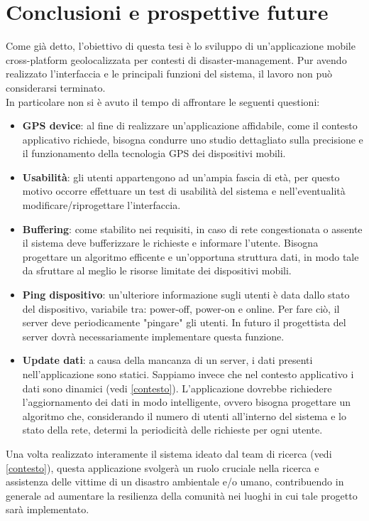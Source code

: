 \chapter{Conclusioni e prospettive future}

Come già detto, l'obiettivo di questa tesi è lo sviluppo di un'applicazione mobile cross-platform geolocalizzata per contesti di disaster-management. Pur avendo realizzato l'interfaccia e le principali funzioni del sistema, il lavoro non può considerarsi terminato. \\
In particolare non si è avuto il tempo di affrontare le seguenti questioni:
\begin{itemize}
\item \textbf{GPS device}: al fine di realizzare un'applicazione affidabile, come il contesto applicativo richiede, bisogna condurre uno studio dettagliato sulla precisione e il funzionamento della tecnologia GPS dei dispositivi mobili.
\item \textbf{Usabilità}: gli utenti appartengono ad un'ampia fascia di età, per questo motivo occorre effettuare un test di usabilità del sistema e nell'eventualità modificare/riprogettare l'interfaccia.
\item \textbf{Buffering}: come stabilito nei requisiti, in caso di rete congestionata o assente il sistema deve bufferizzare le richieste e informare l'utente. Bisogna progettare un algoritmo efficente e un'opportuna struttura dati, in modo tale da sfruttare al meglio le risorse limitate dei dispositivi mobili.
\item \textbf{Ping dispositivo}: un'ulteriore informazione sugli utenti è data dallo stato del dispositivo, variabile tra: power-off, power-on e online. Per fare ciò, il server deve periodicamente "pingare" gli utenti. In futuro il progettista del server dovrà necessariamente implementare questa funzione.
\item \textbf{Update dati}: a causa della mancanza di un server, i dati presenti nell'applicazione sono statici. Sappiamo invece che nel contesto applicativo i dati sono dinamici (vedi \ref{contesto}). L'applicazione dovrebbe richiedere l'aggiornamento dei dati in modo intelligente, ovvero bisogna progettare un algoritmo che, considerando il numero di utenti all'interno del sistema e lo stato della rete, determi la periodicità delle richieste per ogni utente.
\end{itemize}
Una volta realizzato interamente il sistema ideato dal team di ricerca (vedi \ref{contesto}), questa applicazione svolgerà un ruolo cruciale nella ricerca e assistenza delle vittime di un disastro ambientale e/o umano, contribuendo in generale ad aumentare la resilienza della comunità nei luoghi in cui tale progetto sarà implementato.